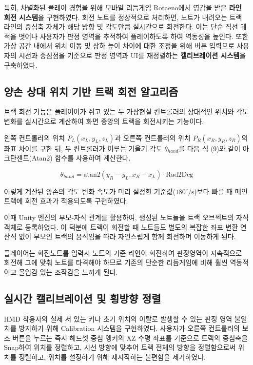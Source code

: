 \documentclass{kcc}
\begin{document}
특히, 차별화된 플레이 경험을 위해 모바일 리듬게임 Rotaeno에서 영감을 받은 \textbf{라인 회전 시스템}을 구현하였다. 회전 노트를 정상적으로 처리하면, 노트가 내려오는 트랙 라인의 중심축 자체가 해당 방향 및 각도만큼 실시간으로 회전한다. 이는 단순 직선 궤적을 벗어나 사용자가 판정 영역을 추적하여 플레이하도록 하여 역동성을 높인다. 또한 가상 공간 내에서 위치 이동 및 상하 높이 차이에 대한 조정을 위해 버튼 입력으로 사용자의 시선과 중심점을 기준으로 판정 영역과 UI를 재정렬하는 \textbf{캘리브레이션 시스템}을 구축하였다.

\subsection{양손 상대 위치 기반 트랙 회전 알고리즘}
트랙 회전 기능은 플레이어가 쥐고 있는 두 가상현실 컨트롤러의 상대적인 위치와 각도 변화를 실시간으로 계산하여 화면 중앙의 트랙을 회전시키는 기능이다. 

왼쪽 컨트롤러의 위치 $P_L(x_L, y_L, z_L)$과 오른쪽 컨트롤러의 위치 $P_R(x_R, y_R, z_R)$의 좌표 차이를 구한 뒤, 두 컨트롤러가 이루는 기울기 각도 $\theta_{hand}$를 다음 식 (9)와 같이 아크탄젠트(Atan2) 함수를 사용하여 계산한다.

\begin{equation}
\theta_{hand} = \text{atan2}(y_R - y_L, x_R - x_L) \cdot \text{Rad2Deg}
\end{equation}

이렇게 계산된 양손의 각도 변화 속도가 미리 설정한 기준값($180^\circ/\text{s}$)보다 빠를 때 메인 트랙에 회전 효과가 적용되도록 구현하였다. 

이때 Unity 엔진의 부모-자식 관계를 활용하여, 생성된 노트들을 트랙 오브젝트의 자식 객체로 등록하였다. 이 덕분에 트랙이 회전할 때 노트들도 별도의 복잡한 좌표 변환 연산식 없이 부모인 트랙의 움직임을 따라 자연스럽게 함께 회전하며 이동하게 된다. 

플레이어는 회전노트를 입력시 노트의 기준 라인이 회전하여 판정영역이 지속적으로 회전해 그에 맞춰 노트를 타격해야 하므로 기존의 단순한 리듬게임에 비해 훨씬 역동적이고 몰입감 있는 조작감을 느끼게 된다.


\subsection{실시간 캘리브레이션 및 횡방향 정렬}
HMD 착용자의 실제 서 있는 키나 초기 위치의 이탈로 발생할 수 있는 판정 영역 불일치를 방지하기 위해 Calibration 시스템을 구현하였다. 사용자가 오른쪽 컨트롤러의 보조 버튼을 누르는 즉시 헤드셋 중심 앵커의 XZ 수평 좌표를 기준으로 트랙의 중심축을 Snap하여 위치를 정렬하고, 시선 방향에 맞추어 트랙 전체의 방향을 정렬함으로써 위치를 정렬하고, 위치를 설정하기 위해 재시작하는 불편함을 제거하였다.
\end{document}
